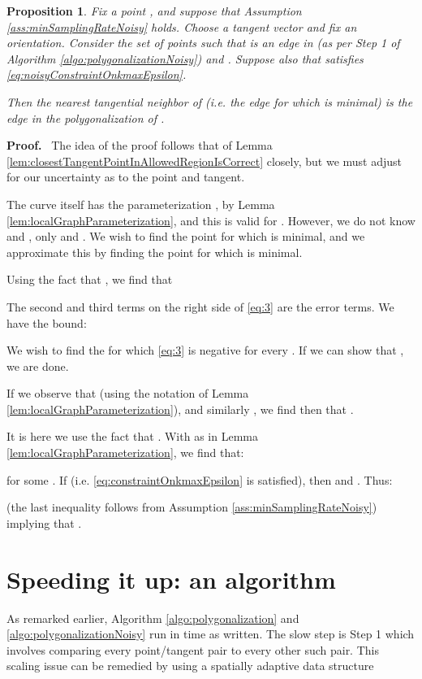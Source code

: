 \documentclass{article}
\newtheorem{proposition}[cntr]{Proposition}
\newenvironment{proof}{
  \noindent\textbf{Proof.}\ }{\hspace*{\fill}
  \medskip}
\numberwithin{cntr}{section}
\numberwithin{equation}{section}
\begin{document}
\begin{proposition}
  \label{lem:noisyClosestTangentPointInAllowedRegionIsCorrect}
  Fix a point , and suppose that Assumption \ref{ass:minSamplingRateNoisy} holds. Choose a tangent vector  and fix an orientation. Consider the set of points  such that  is an edge in  (as per Step 1 of Algorithm \ref{algo:polygonalizationNoisy}) and . Suppose also that  satisfies \eqref{eq:noisyConstraintOnkmaxEpsilon}.

  Then the nearest tangential neighbor of  (i.e. the edge for which  is minimal) is the edge in the polygonalization of .
\end{proposition}

\begin{proof}
  The idea of the proof follows that of Lemma \ref{lem:closestTangentPointInAllowedRegionIsCorrect} closely, but we must adjust for our uncertainty as to the point and tangent.

  The curve itself has the parameterization , by Lemma \ref{lem:localGraphParameterization}, and this is valid for . However, we do not know  and , only  and . We wish to find the point  for which  is minimal, and we approximate this by finding the point for which  is minimal.

Using the fact that , we find that

The second and third terms on the right side of \eqref{eq:3} are the error terms. We have the bound:

We wish to find the  for which \eqref{eq:3} is negative for every . If we can show that , we are done.

If we observe that  (using the notation of Lemma \ref{lem:localGraphParameterization}), and similarly , we find then that .

It is here we use the fact that . With  as in Lemma \ref{lem:localGraphParameterization}, we find that:

for some . If  (i.e. \eqref{eq:constraintOnkmaxEpsilon} is satisfied), then  and . Thus:

(the last inequality follows from Assumption \ref{ass:minSamplingRateNoisy}) implying that .
\end{proof}


\section{Speeding it up: an  algorithm}
\label{sec:quadTreeSection}

As remarked earlier, Algorithm \ref{algo:polygonalization} and \ref{algo:polygonalizationNoisy} run in  time as written. The slow step is Step 1 which involves comparing every point/tangent pair to every other such pair. This scaling issue can be remedied by using a spatially adaptive data structure
\cite{quadtrees}
\end{document}
